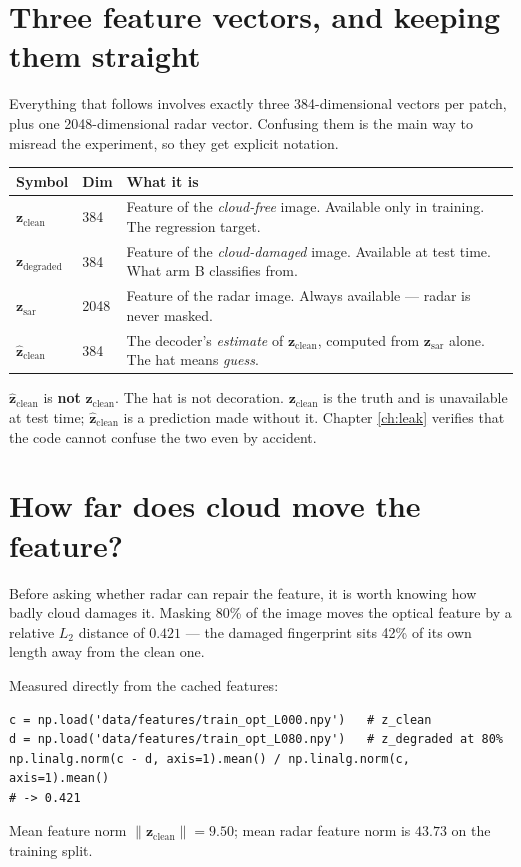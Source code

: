 \documentclass[11pt,a4paper]{report}
\newcommand{\zc}{\mathbf{z}_{\text{clean}}}
\newcommand{\zd}{\mathbf{z}_{\text{degraded}}}
\newcommand{\zs}{\mathbf{z}_{\text{sar}}}
\newcommand{\zh}{\hat{\mathbf{z}}_{\text{clean}}}
\begin{document}
\section{Three feature vectors, and keeping them straight}

Everything that follows involves exactly three 384-dimensional vectors per
patch, plus one 2048-dimensional radar vector. Confusing them is the main way to
misread the experiment, so they get explicit notation.

\begin{center}
\small
\begin{tabular}{@{}llp{8.2cm}@{}}
\toprule
\textbf{Symbol} & \textbf{Dim} & \textbf{What it is} \\
\midrule
$\zc$   & 384 & Feature of the \emph{cloud-free} image. Available only in
                training. The regression target. \\
$\zd$   & 384 & Feature of the \emph{cloud-damaged} image. Available at test
                time. What arm B classifies from. \\
$\zs$   & 2048 & Feature of the radar image. Always available --- radar is never
                masked. \\
$\zh$   & 384 & The decoder's \emph{estimate} of $\zc$, computed from $\zs$
                alone. The hat means \emph{guess}. \\
\bottomrule
\end{tabular}
\end{center}

\begin{flagbox}
$\zh$ is \textbf{not} $\zc$. The hat is not decoration. $\zc$ is the truth and is
unavailable at test time; $\zh$ is a prediction made without it. Chapter
\ref{ch:leak} verifies that the code cannot confuse the two even by accident.
\end{flagbox}

\section{How far does cloud move the feature?}

Before asking whether radar can repair the feature, it is worth knowing how
badly cloud damages it. Masking 80\% of the image moves the optical feature by a
relative $L_2$ distance of $0.421$ --- the damaged fingerprint sits 42\% of its
own length away from the clean one.

\begin{codedoes}
Measured directly from the cached features:
\begin{lstlisting}
c = np.load('data/features/train_opt_L000.npy')   # z_clean
d = np.load('data/features/train_opt_L080.npy')   # z_degraded at 80%
np.linalg.norm(c - d, axis=1).mean() / np.linalg.norm(c, axis=1).mean()
# -> 0.421
\end{lstlisting}
Mean feature norm $\|\zc\| = 9.50$; mean radar feature norm is $43.73$ on the
training split.
\end{codedoes}
\end{document}
